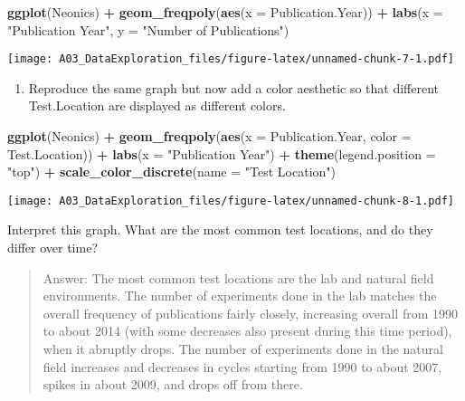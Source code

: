 \documentclass[]{article}
\newenvironment{Shaded}{\begin{snugshade}}{\end{snugshade}}
\newcommand{\DataTypeTok}[1]{\textcolor[rgb]{0.13,0.29,0.53}{#1}}
\newcommand{\KeywordTok}[1]{\textcolor[rgb]{0.13,0.29,0.53}{\textbf{#1}}}
\newcommand{\NormalTok}[1]{#1}
\newcommand{\OperatorTok}[1]{\textcolor[rgb]{0.81,0.36,0.00}{\textbf{#1}}}
\newcommand{\StringTok}[1]{\textcolor[rgb]{0.31,0.60,0.02}{#1}}
\providecommand{\tightlist}{%
  \setlength{\itemsep}{0pt}\setlength{\parskip}{0pt}}
\begin{document}
\begin{Shaded}
\begin{Highlighting}[]
\KeywordTok{ggplot}\NormalTok{(Neonics) }\OperatorTok{+}\StringTok{ }\KeywordTok{geom_freqpoly}\NormalTok{(}\KeywordTok{aes}\NormalTok{(}\DataTypeTok{x =}\NormalTok{ Publication.Year)) }\OperatorTok{+}\StringTok{ }\KeywordTok{labs}\NormalTok{(}\DataTypeTok{x =} \StringTok{"Publication Year"}\NormalTok{, }
    \DataTypeTok{y =} \StringTok{"Number of Publications"}\NormalTok{)}
\end{Highlighting}
\end{Shaded}

\texttt{[image: A03\_DataExploration\_files/figure-latex/unnamed-chunk-7-1.pdf]}

\begin{enumerate}
\def\labelenumi{\arabic{enumi}.}
\setcounter{enumi}{9}
\tightlist
\item
  Reproduce the same graph but now add a color aesthetic so that
  different Test.Location are displayed as different colors.
\end{enumerate}

\begin{Shaded}
\begin{Highlighting}[]
\KeywordTok{ggplot}\NormalTok{(Neonics) }\OperatorTok{+}\StringTok{ }\KeywordTok{geom_freqpoly}\NormalTok{(}\KeywordTok{aes}\NormalTok{(}\DataTypeTok{x =}\NormalTok{ Publication.Year, }\DataTypeTok{color =}\NormalTok{ Test.Location)) }\OperatorTok{+}\StringTok{ }
\StringTok{    }\KeywordTok{labs}\NormalTok{(}\DataTypeTok{x =} \StringTok{"Publication Year"}\NormalTok{) }\OperatorTok{+}\StringTok{ }\KeywordTok{theme}\NormalTok{(}\DataTypeTok{legend.position =} \StringTok{"top"}\NormalTok{) }\OperatorTok{+}\StringTok{ }\KeywordTok{scale_color_discrete}\NormalTok{(}\DataTypeTok{name =} \StringTok{"Test Location"}\NormalTok{)}
\end{Highlighting}
\end{Shaded}

\texttt{[image: A03\_DataExploration\_files/figure-latex/unnamed-chunk-8-1.pdf]}

Interpret this graph. What are the most common test locations, and do
they differ over time?

\begin{quote}
Answer: The most common test locations are the lab and natural field
environments. The number of experiments done in the lab matches the
overall frequency of publications fairly closely, increasing overall
from 1990 to about 2014 (with some decreases also present during this
time period), when it abruptly drops. The number of experiments done in
the natural field increases and decreases in cycles starting from 1990
to about 2007, spikes in about 2009, and drops off from there.
\end{quote}
\end{document}
